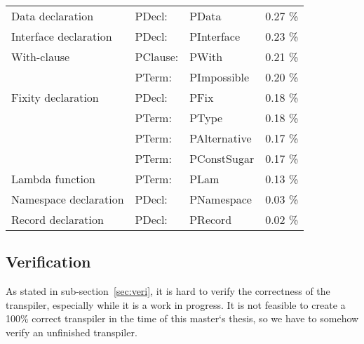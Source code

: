 \begin{table}[h]
\begin{center}
\begin{tabular}{ l l l r }
    Data declaration         & PDecl:   &    PData           &    0.27  \% \\
    Interface declaration    & PDecl:   &    PInterface      &    0.23  \% \\
    With-clause              & PClause: &    PWith           &    0.21  \% \\
                             & PTerm:   &    PImpossible     &    0.20  \% \\
    Fixity declaration       & PDecl:   &    PFix            &    0.18  \% \\
                             & PTerm:   &    PType           &    0.18  \% \\
                             & PTerm:   &    PAlternative    &    0.17  \% \\
                             & PTerm:   &    PConstSugar     &    0.17  \% \\
    Lambda function          & PTerm:   &    PLam            &    0.13  \% \\
    Namespace declaration    & PDecl:   &    PNamespace      &    0.03  \% \\
    Record declaration       & PDecl:   &    PRecord         &    0.02  \% \\

  \end{tabular}
\end{center}
\end{table}




\subsection{Verification} \label{sec:methveri}


As stated in sub-section~\ref{sec:veri}, it is hard to verify the correctness
of the transpiler, especially while it is a work in progress. It is not
feasible to create a 100\% correct transpiler in the time of this master`s
thesis, so we have to somehow verify an unfinished transpiler.

